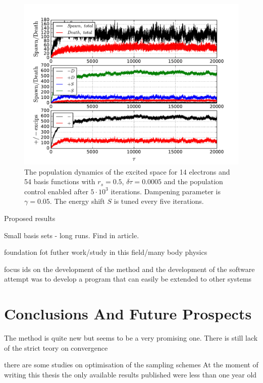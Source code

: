 \documentclass[twoside,english]{uiofysmaster}
\begin{document}
\begin{landscape}
	
	\begin{figure}[ht!]
		\centering
		\includegraphics[width=0.8\linewidth]{platFindStune}
		\caption{The population dynamics of the excited space for 14 electrons and 54 basis functions with $r_s=0.5$, $\delta \tau=0.0005$ and the population control enabled after $5\cdot 10^3$ iterations. Dampening parameter is $\gamma = 0.05$. The energy shift $S$ is tuned every five iterations.}
		\label{fig:platFindStune}
	\end{figure}
	
\end{landscape}






Proposed results

Small basis sets - long runs. Find in article.



foundation fot futher work/study in this field/many body physics

focus ids on the development of the method and the development of the software
attempt was to develop a program that can easily be extended to other systems



\section{Conclusions And Future Prospects}

The method is quite new but seems to be a very promising one. There is still lack of the strict teory on convergence 

there are some studies on optimisation of the sampling schemes
At the moment of writing this thesis the only available results published were less than one year old
\end{document}
